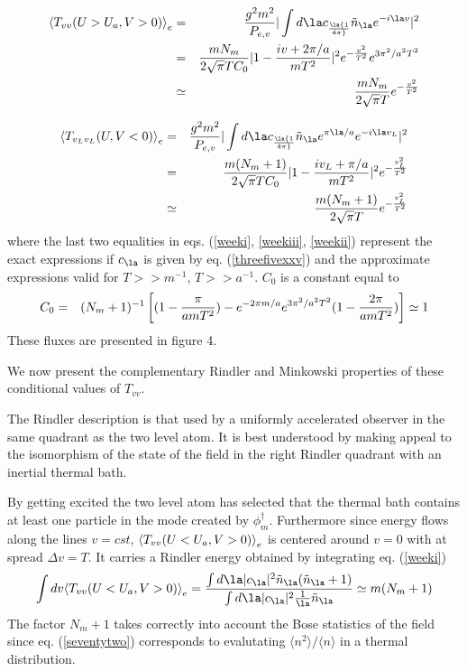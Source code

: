 \documentclass[12pt]{article}
\begin{document}
\begin{eqnarray}
 \bk{T_{vv}(U>U_a, V > 0 )}_{e}
&=&{ g^2 m^2 \over P_{e,v}} \vert \int d \la c_\la
{1 \over 4 \pi}
 \tilde n_\la e^{-i\la v} \vert^2   \nonumber\\
&=& {m N_m \over  2 \sqrt {\pi} T C_0}
 \vert 1 - {i v + 2 \pi /a \over m T^2}\vert^2   e^{-{ v^2\over
T^2}} e^{ 3\pi ^2 / a^2  T^2} \nonumber\\  &\simeq& { m N_m
\over 2 \sqrt{ \pi} T }
e^{-{ v^2\over T^2}}
 \label{weekiii}\end{eqnarray}

\begin{eqnarray}
\bk{T_{v_Lv_L}(U, V < 0 )}_{e}
&=& { g^2 m^2 \over P_{e,v}} \vert
\int d \la c_\la
{1 \over 4 \pi}
\tilde n_\la e^{\pi \la /a} e^{-i\la v_L} \vert^2  \nonumber\\  &=& {m (N_m +
1)
\over  2 \sqrt {\pi} T C_0}
 \vert 1 - {i v_L +  \pi /a \over m T^2} \vert^2 e^{-{ v_L^2\over T^2}}
\nonumber\\ &\simeq& { m (N_m +1)\over 2 \sqrt{ \pi} T } e^{ - {v_L^2
\over T^2}}
\label{weekii}\end{eqnarray}
where the last two equalities in eqs. (\ref{weeki}, \ref{weekiii},
\ref{weekii})
represent the exact expressions if $c_\la$ is given by eq.
(\ref{threefivexxv}) and the
approximate expressions valid for $T>>m^{-1}$, $T>>a^{-1}$. $C_0$ is a constant
equal to \begin{eqnarray}
 C_0 &=& (N_m + 1)^{-1}\left [ (1 - { \pi \over a m T^2}) - e^{- 2 \pi m/a}
e^{ 3\pi ^2 / a^2  T^2} (1 - { 2 \pi \over a m T^2})
\right]
\simeq 1
\end{eqnarray}
These fluxes are presented in figure 4.


We now present the
complementary Rindler and
Minkowski properties of these
conditional values of $T_{vv}$.

The Rindler description is that used by a uniformly accelerated observer in
the same quadrant as the two level atom. It is best understood by making
appeal to the isomorphism of the state of the field in the right Rindler
quadrant with an inertial thermal bath.

By getting excited the two level atom has selected that the thermal bath
contains at least one particle in the mode created by $\phi_m^\dagger$.
Furthermore since energy flows along the lines $v=cst$,
$\mbox{$ \langle T_{vv}(U<U_a, V>0 ) \rangle $}_{e}$ is centered around $v=0$
with at spread $\Delta v =T$.  It carries a Rindler energy obtained by
integrating eq. (\ref{weeki})
\begin{equation}
 \int dv \bk{T_{vv}(U<U_a, V>0 )}_{e} = { \int d \la \vert c_\la
\vert^2 \tilde n_\la ( \tilde n _\la +1 ) \over \int d \la \vert c_\la
\vert^2 {1 \over \la} \tilde n_\la }
\simeq  m(N_m +1)
\label{seventytwo}
\end{equation}
The factor $N_m+1$ takes  correctly into account the Bose statistics of the
field since eq. (\ref{seventytwo}) corresponds to evalutating $\langle n^2
\rangle /\langle n \rangle$
in a thermal
distribution.
\end{document}
